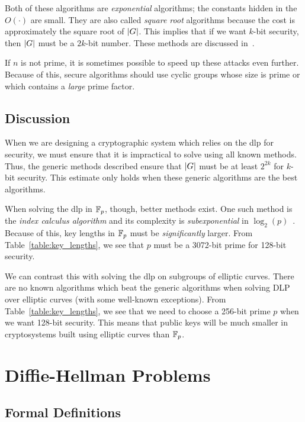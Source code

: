 \noindent
Both of these algorithms are \emph{exponential} algorithms;
the constants hidden in the $O(\cdot)$ are small.
They are also called \emph{square root} algorithms because
the cost is approximately the square root of $\left| G \right|$.
This implies that if we want $k$-bit security,
then $\left| G \right|$ must be a $2k$-bit number.
These methods are discussed in~\cite[Chapter 10]{IntroModernCrypto}.

If $n$ is not prime, it is sometimes possible to speed up
these attacks even further.
Because of this, secure algorithms should use \glspl{cyclic group} whose size
is prime or which contains a \emph{large} prime factor.

\subsection{Discussion}

When we are designing a cryptographic system which relies
on the \gls{dlp} for security,
we must ensure that it is impractical to solve using all known methods.
Thus, the generic methods described ensure that $\left| G \right|$ must be
at least $2^{2k}$ for $k$-bit security.
This estimate only holds when these generic algorithms are the best
algorithms.

When solving the \gls{dlp} in $\mathbb{F}_{p}$, though, better methods exist.
One such method is the \emph{index calculus algorithm}
and its complexity is
\emph{subexponential} in $\log_{2}(p)$~\cite[Chapter 10]{IntroModernCrypto}.
Because of this, key lengths in $\mathbb{F}_{p}$ must be \emph{significantly}
larger.
From Table~\ref{table:key_lengths}, we see that
$p$ must be a 3072-bit prime for 128-bit security.

We can contrast this with solving the \gls{dlp} on \glspl{subgroup}
of \glspl{elliptic curve}.
There are no known algorithms which beat the generic algorithms
when solving DLP over \glspl{elliptic curve}
(with some well-known exceptions).
From Table~\ref{table:key_lengths}, we see that
we need to choose a 256-bit prime $p$ when we want 128-bit security.
This means that public keys will be much smaller in cryptosystems
built using \glspl{elliptic curve} than $\mathbb{F}_{p}$.



\section{Diffie-Hellman Problems}

\subsection{Formal Definitions}

